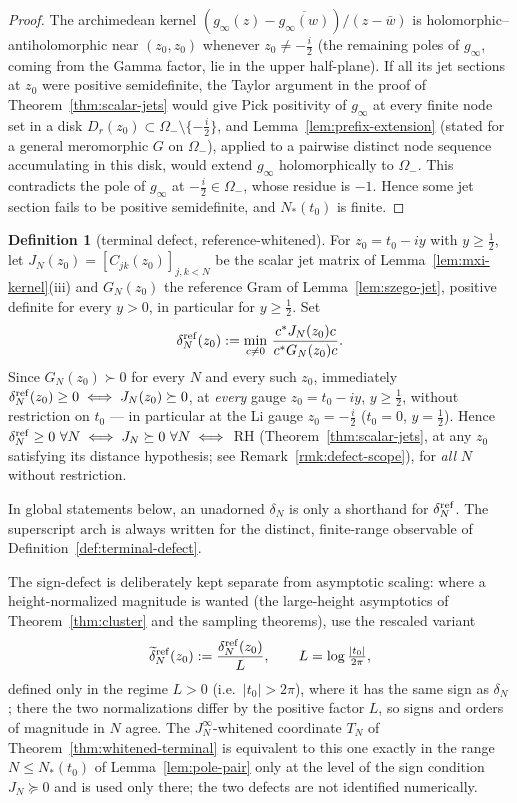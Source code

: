 \documentclass[11pt]{amsart}
\theoremstyle{definition}
\newtheorem{definition}[theorem]{Definition}
\theoremstyle{remark}
\theoremstyle{definition}
\newcommand{\half}{\tfrac{1}{2}}
\begin{document}
\begin{proof}
The archimedean kernel $(g_\infty(z)-\overline{g_\infty(w)})/(z-\bar w)$ is
holomorphic--antiholomorphic near $(z_0,z_0)$ whenever $z_0\ne-\tfrac i2$ (the remaining poles of
$g_\infty$, coming from the Gamma factor, lie in the upper half-plane).  If all its jet sections at
$z_0$ were positive semidefinite, the Taylor argument in the proof of Theorem~\ref{thm:scalar-jets}
would give Pick positivity of $g_\infty$ at every finite node set in a disk
$D_r(z_0)\subset\Omega_-\setminus\{-\tfrac i2\}$, and Lemma~\ref{lem:prefix-extension} (stated for a
general meromorphic $G$ on $\Omega_-$), applied to a pairwise distinct node sequence accumulating in
this disk, would extend $g_\infty$ holomorphically to $\Omega_-$.  This contradicts the pole of
$g_\infty$ at $-\tfrac i2\in\Omega_-$, whose residue is $-1$.  Hence some jet section fails to be
positive semidefinite, and $N_*(t_0)$ is finite.
\end{proof}

\begin{definition}[terminal defect, reference-whitened]\label{def:terminal-defect-fixed}
For $z_0=t_0-iy$ with $y\ge\half$, let $J_N(z_0)=[C_{jk}(z_0)]_{j,k<N}$ be the scalar jet matrix of
Lemma~\ref{lem:mxi-kernel}(iii) and $G_N(z_0)$ the reference Gram of Lemma~\ref{lem:szego-jet},
positive definite for every $y>0$, in particular for $y\ge\half$.  Set
\[
   \delta_N^{\rm ref}(z_0):=\min_{c\ne0}\,\frac{c^*J_N(z_0) c}{c^*G_N(z_0) c}.
\]
Since $G_N(z_0)\succ0$ for every $N$ and every such $z_0$, immediately
$\delta_N^{\rm ref}(z_0)\ge0\iff J_N(z_0)\succeq0$, at \emph{every} gauge $z_0=t_0-iy$, $y\ge\half$, without
restriction on $t_0$ --- in particular at the Li gauge $z_0=-\tfrac i2$ ($t_0=0$, $y=\half$).  Hence
$\delta_N^{\rm ref}\ge0\ \forall N\iff J_N\succeq0\ \forall N\iff$ RH (Theorem~\ref{thm:scalar-jets}, at any
$z_0$ satisfying its distance hypothesis; see Remark~\ref{rmk:defect-scope}), for
\emph{all} $N$ without restriction.

In global statements below, an unadorned $\delta_N$ is only a shorthand for
$\delta_N^{\rm ref}$.  The superscript $\mathrm{arch}$ is always written for the distinct,
finite-range observable of Definition~\ref{def:terminal-defect}.

The sign-defect is deliberately kept separate from asymptotic scaling: where a height-normalized
magnitude is wanted (the large-height asymptotics of Theorem~\ref{thm:cluster} and the sampling
theorems), use the rescaled variant
\[
   \widetilde\delta_N^{\rm ref}(z_0):=\frac{\delta_N^{\rm ref}(z_0)}{L},\qquad L=\log\tfrac{|t_0|}{2\pi},
\]
defined only in the regime $L>0$ (i.e.\ $|t_0|>2\pi$), where it has the same sign as $\delta_N$; there
the two normalizations differ by the positive factor $L$, so signs and orders of magnitude in $N$
agree.  The $J_N^\infty$-whitened coordinate $T_N$ of
Theorem~\ref{thm:whitened-terminal} is equivalent to this one exactly in the range $N\le N_*(t_0)$ of
Lemma~\ref{lem:pole-pair} only at the level of the sign condition $J_N\succeq0$ and is used only there;
the two defects are not identified numerically.
\end{definition}
\end{document}
